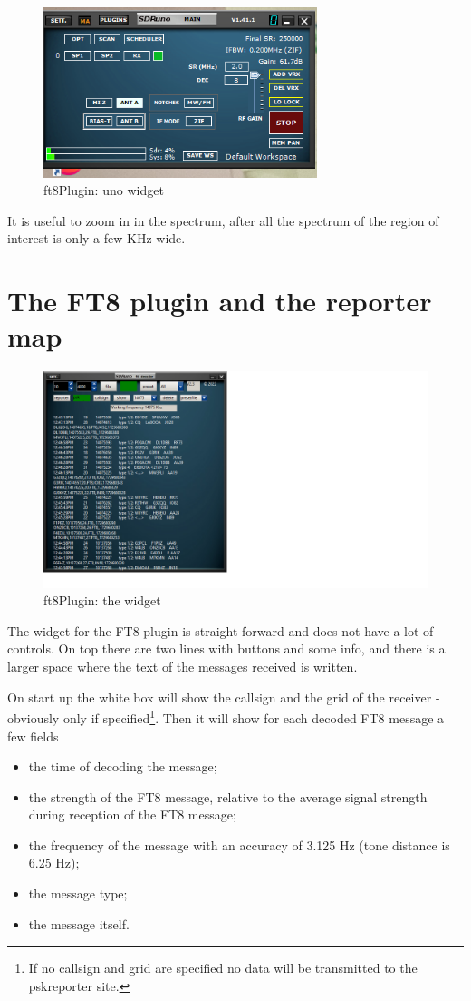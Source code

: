 \documentclass[11pt]{article}
\begin{document}
\begin{figure}[htp]
\centering
\includegraphics[width=80mm]{uno-main-widget.png}
\caption{ft8Plugin: uno widget}
\label{figure:freq_select}
\end{figure}

It is useful to zoom in in the spectrum, after all
the spectrum of the region of interest is only a few KHz wide.
\section{The FT8 plugin and the reporter map}
\begin{figure}[htp]
\centering
\includegraphics[width=170mm]{ft8-widget.png}
\caption{ft8Plugin: the widget}
\label{figure:ft8_widget}
\end{figure}
\par
The widget for the FT8 plugin is straight forward and does not have a lot
of controls.
On top there are two lines with buttons and some info,
and there is a larger space where the text of the messages received is written.
\par
On start up the white box will show the callsign and the grid of the
receiver - obviously only if specified\footnote{If no callsign and grid are
specified no data will be transmitted to the pskreporter site.}.
Then it will show for each decoded FT8 message a few fields
\begin{itemize}
\item
the time of decoding the message;
\item
the strength of the FT8 message, relative to the average signal
strength during reception of the FT8 message;
\item the frequency of the message with an accuracy of 3.125 Hz (tone
distance is 6.25 Hz);
\item the message type;
\item the message itself.
\end{itemize}
\end{document}
